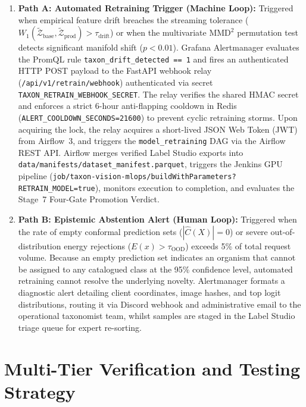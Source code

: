 \begin{enumerate}
    \item \textbf{Path A: Automated Retraining Trigger (Machine Loop):}
    Triggered when empirical feature drift breaches the streaming tolerance ($W_1(\tilde{\mathcal{Z}}_{\text{base}}, \tilde{\mathcal{Z}}_{\text{prod}}) > \tau_{\text{drift}}$) or when the multivariate $\text{MMD}^2$ permutation test detects significant manifold shift ($p < 0.01$). Grafana Alertmanager evaluates the PromQL rule \texttt{taxon\_drift\_detected == 1} and fires an authenticated HTTP POST payload to the FastAPI webhook relay (\nolinkurl{/api/v1/retrain/webhook}) authenticated via secret \texttt{TAXON\_\allowbreak RETRAIN\_\allowbreak WEBHOOK\_\allowbreak SECRET}. The relay verifies the shared HMAC secret and enforces a strict 6-hour anti-flapping cooldown in Redis (\texttt{ALERT\_\allowbreak COOLDOWN\_\allowbreak SECONDS=21600}) to prevent cyclic retraining storms. Upon acquiring the lock, the relay acquires a short-lived JSON Web Token (JWT) from Airflow~3, and triggers the \texttt{model\_retraining} DAG via the Airflow REST API. Airflow merges verified Label Studio exports into \nolinkurl{data/manifests/dataset_manifest.parquet}, triggers the Jenkins GPU pipeline (\nolinkurl{job/taxon-vision-mlops/buildWithParameters?RETRAIN_MODEL=true}), monitors execution to completion, and evaluates the Stage~7 Four-Gate Promotion Verdict.
    
    \item \textbf{Path B: Epistemic Abstention Alert (Human Loop):}
    Triggered when the rate of empty conformal prediction sets ($|\hat{C}(X)| = 0$) or severe out-of-distribution energy rejections ($E(x) > \tau_{\text{OOD}}$) exceeds 5\% of total request volume. Because an empty prediction set indicates an organism that cannot be assigned to any catalogued class at the 95\% confidence level, automated retraining cannot resolve the underlying novelty. Alertmanager formats a diagnostic alert detailing client coordinates, image hashes, and top logit distributions, routing it via Discord webhook and administrative email to the operational taxonomist team, whilst samples are staged in the Label Studio triage queue for expert re-sorting.
\end{enumerate}

\section{Multi-Tier Verification and Testing Strategy}
\label{sec:testing_strategy}


